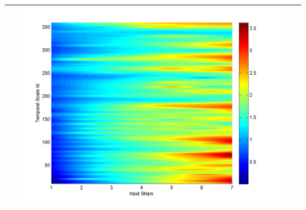 \documentclass[11pt]{article}
\begin{document}
\begin{table}[H]
{\begin{tabular}{cccc}
&\begin{minipage}{.3\textwidth}\includegraphics[width=\linewidth]{resultgraph/07243500pepq.png}\end{minipage} 
\\
\bottomrule
\end{tabular}
}
\end{table}
\end{document}
